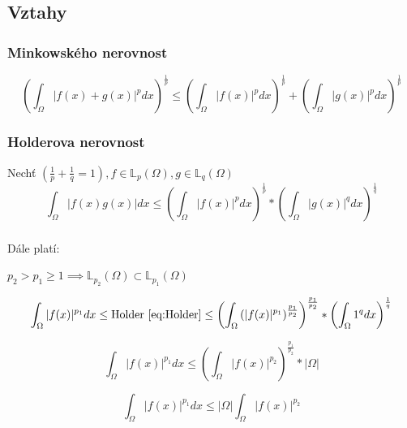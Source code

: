 \documentclass[../main.tex]{subfiles}
\begin{document}
\subsection{Vztahy}

\subsubsection{Minkowského nerovnost}
\begin{equation}\label{eq:Mink}
    \left ( \int_\Omega |f(x) + g(x)|^p dx \right ) ^{\frac{1}{p}} \leq \left ( \int_\Omega |f(x)|^p dx \right ) ^{\frac{1}{p}} + \left ( \int_\Omega |g(x)|^p dx \right ) ^{\frac{1}{p}}
\end{equation}


\subsubsection{Holderova nerovnost}
Nechť $\left (  \frac{1}{p} + \frac{1}{q} = 1 \right ), f \in \mathbb{L}_p(\Omega), g \in \mathbb{L}_q(\Omega)$
\begin{equation}\label{eq:Holder}
    \int_\Omega \left| f(x)g(x) \right| dx \leq \left ( \int_\Omega |f(x)|^p dx \right ) ^{\frac{1}{p}} * \left ( \int_\Omega |g(x)|^q dx \right ) ^{\frac{1}{q}}
\end{equation}

\subsubsection{}
Dále platí: 

$p_2 > p_1 \geq 1 \implies \mathbb{L}_{p_2}(\Omega) \subset \mathbb{L}_{p_1}(\Omega)$

\begin{equation*}
    \int_\Omega |f(x)|^{p_1}dx \leq \text{Holder \eqref{eq:Holder}} \leq \left ( \int_\Omega \left ( |f(x)|^{p_1}\right )^{\frac{p_1}{p_2}} \right )^\frac{p_1}{p_2} * \left ( \int_\Omega 1 ^q dx \right ) ^ \frac{1}{q}
\end{equation*}

\begin{equation*}
    \int_\Omega |f(x)|^{p_1}dx \leq \left( \int_\Omega |f(x)|^{p_2} \right)^{\frac{p_1}{p_2}} * |\Omega|
\end{equation*}

\begin{equation*}
    \int_\Omega |f(x)|^{p_1}dx \leq |\Omega| \int_\Omega |f(x)|^{p_2}
\end{equation*}
\end{document}
